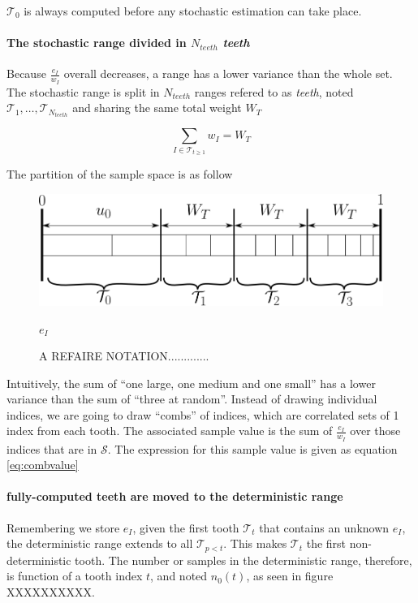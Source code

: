 \documentclass[./thesis.tex]{subfiles}
\begin{document}
$\mathcal{T}_0$ is always computed before any stochastic estimation can take place.

\paragraph{The stochastic range divided in $N_{teeth}$ \emph{teeth}}

Because $\frac{e_I}{w_I}$ overall decreases, a range has a lower variance than the whole set. The stochastic range is split in $N_{teeth}$ ranges refered to as \emph{teeth}, noted $\mathcal{T}_1,\ldots,\mathcal{T}_{N_{teeth}}$ and sharing the same total weight $W_T$

\begin{equation}
\sum_{I \in \mathcal{T}_{t \geq 1}} w_I=W_T
\end{equation}

The partition of the sample space is as follow

 \begin{figure}[h!]
	\begin{center}
		\includegraphics[width=0.9\columnwidth]{figures/pt2/teeth}
		\caption{A REFAIRE NOTATION.............}
		\label{fig:teeth}
		$e_I$
	\end{center}
\end{figure}

Intuitively, the sum of ``one large, one medium and one small'' has a lower variance than the sum of ``three at random''. Instead of drawing individual indices, we are going to draw ``combs'' of indices, which are correlated sets of 1 index from each tooth. The associated sample value is the sum of $\frac{e_I}{w_I}$ over those indices that are in $\mathcal{S}$.  The expression for this sample value is given as equation \ref{eq:combvalue}

\paragraph{fully-computed teeth are moved to the deterministic range}

Remembering we store $e_I$, given the first tooth $\mathcal{T}_t$ that contains an unknown $e_I$, the deterministic range extends to all $\mathcal{T}_{p<t}$. This makes $\mathcal{T}_t$ the first non-deterministic tooth.
The number or samples in the deterministic range, therefore, is function of a tooth index $t$, and noted $n_0(t)$, as seen in figure XXXXXXXXXX.
\end{document}
